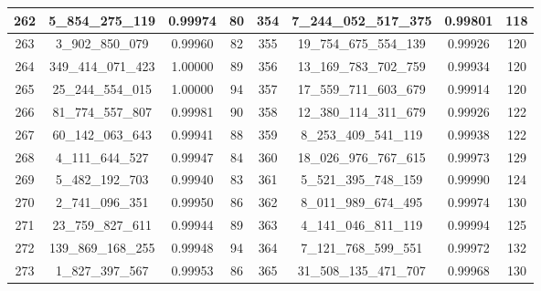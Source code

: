 \documentclass[letterpaper]{article}
\begin{document}
{\begin{tabular}{|c c c c| c c c c|}
        \hline
        262             & 5\_854\_275\_119   & 0.99974          & 80              & 354          & 7\_244\_052\_517\_375  & 0.99801          & 118             \\
        \hline
        263             & 3\_902\_850\_079   & 0.99960          & 82              & 355          & 19\_754\_675\_554\_139 & 0.99926          & 120             \\
        \hline
        264             & 349\_414\_071\_423 & 1.00000          & 89              & 356          & 13\_169\_783\_702\_759 & 0.99934          & 120             \\
        \hline
        265             & 25\_244\_554\_015  & 1.00000          & 94              & 357          & 17\_559\_711\_603\_679 & 0.99914          & 120             \\
        \hline
        266             & 81\_774\_557\_807  & 0.99981          & 90              & 358          & 12\_380\_114\_311\_679 & 0.99926          & 122             \\
        \hline
        267             & 60\_142\_063\_643  & 0.99941          & 88              & 359          & 8\_253\_409\_541\_119  & 0.99938          & 122             \\
        \hline
        268             & 4\_111\_644\_527   & 0.99947          & 84              & 360          & 18\_026\_976\_767\_615 & 0.99973          & 129             \\
        \hline
        269             & 5\_482\_192\_703   & 0.99940          & 83              & 361          & 5\_521\_395\_748\_159  & 0.99990          & 124             \\
        \hline
        270             & 2\_741\_096\_351   & 0.99950          & 86              & 362          & 8\_011\_989\_674\_495  & 0.99974          & 130             \\
        \hline
        271             & 23\_759\_827\_611  & 0.99944          & 89              & 363          & 4\_141\_046\_811\_119  & 0.99994          & 125             \\
        \hline
        272             & 139\_869\_168\_255 & 0.99948          & 94              & 364          & 7\_121\_768\_599\_551  & 0.99972          & 132             \\
        \hline
        273             & 1\_827\_397\_567   & 0.99953          & 86              & 365          & 31\_508\_135\_471\_707 & 0.99968          & 130             \\

\end{tabular}}
\end{document}
